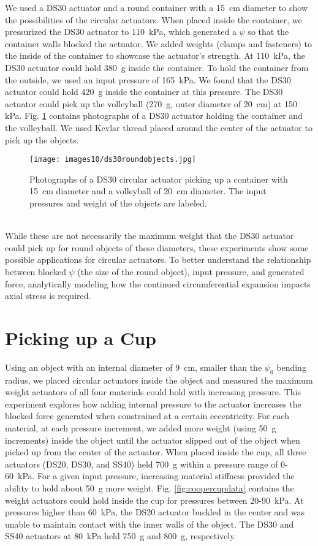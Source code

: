 We used a DS30 actuator and a round container with a 15~cm diameter to show the possibilities of the circular actuators. When placed inside the container, we pressurized the DS30 actuator to 110~kPa, which generated a $\psi$ so that the container walls blocked the actuator. We added weights (clamps and fasteners) to the inside of the container to showcase the actuator's strength. At 110~kPa, the DS30 actuator could hold 380~g inside the container. To hold the container from the outside, we used an input pressure of 165~kPa. We found that the DS30 actuator could hold 420~g inside the container at this pressure. The DS30 actuator could pick up the volleyball (270~g, outer diameter of 20~cm) at 150 kPa. Fig. \ref{fig:ds30roundobjects} contains photographs of a DS30 actuator holding the container and the volleyball. We used Kevlar thread placed around the center of the actuator to pick up the objects. 
\\
\begin{figure}[ht]
    \centering
     \texttt{[image: images10/ds30roundobjects.jpg]}
    \caption{Photographs of a DS30 circular actuator picking up a container with 15~cm diameter and a volleyball of 20~cm diameter. The input pressures and weight of the objects are labeled.}
    \label{fig:ds30roundobjects}
\end{figure}
\\
While these are not necessarily the maximum weight that the DS30 actuator could pick up for round objects of these diameters, these experiments show some possible applications for circular actuators. To better understand the relationship between blocked $\psi$ (the size of the round object), input pressure, and generated force, analytically modeling how the continued circumferential expansion impacts axial stress is required. 

\section{Picking up a Cup}

Using an object with an internal diameter of 9~cm, smaller than the $\psi_0$ bending radius, we placed circular actuators inside the object and measured the maximum weight actuators of all four materials could hold with increasing pressure. This experiment explores how adding internal pressure to the actuator increases the blocked force generated when constrained at a certain eccentricity. For each material, at each pressure increment, we added more weight (using 50~g increments) inside the object until the actuator slipped out of the object when picked up from the center of the actuator. When placed inside the cup, all three actuators (DS20, DS30, and SS40) held 700~g within a pressure range of 0-60~kPa. For a given input pressure, increasing material stiffness provided the ability to hold about 50~g more weight. Fig. \ref{fig:coopercupdata} contains the weight actuators could hold inside the cup for pressures between 20-90~kPa. At pressures higher than 60~kPa, the DS20 actuator buckled in the center and was unable to maintain contact with the inner walls of the object. The DS30 and SS40 actuators at 80~kPa held 750~g and 800~g, respectively. 

